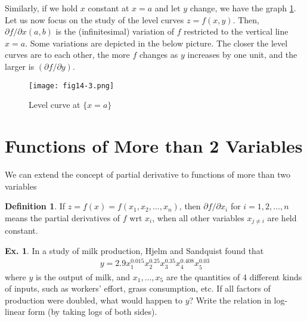 \documentclass[10pt,a4paper]{book}
\theoremstyle{definition}\newtheorem{definition}{Definition}
\theoremstyle{definition}\newtheorem{fact}{Fact}
\theoremstyle{definition}\newtheorem{ex}{Ex.}
\theoremstyle{definition}\newtheorem{project}{Project}
\theoremstyle{definition}\newtheorem{problem}{Problem}
\theoremstyle{definition}\newtheorem{example}{Example}
\numberwithin{theorem}{chapter}
\numberwithin{corollary}{chapter}
\numberwithin{assumption}{chapter}
\numberwithin{definition}{chapter}
\numberwithin{prop}{chapter}
\numberwithin{notation}{chapter}
\numberwithin{problem}{chapter}
\numberwithin{example}{chapter}
\numberwithin{fact}{chapter}
\numberwithin{ex}{chapter}
\newenvironment{fdefinition}
{\begin{mdframed}\begin{definition}}
		{\end{definition}\end{mdframed}}
\begin{document}
	Similarly, if we hold $x$ constant at $x=a$ and let $y$ change, we have the graph \ref{fig:14-3}. Let us now focus on the study of the level curves $z=f(x,y)$. Then, $\partial f / \partial x (a,b)$ is the (infinitesimal) variation of $f$ restricted to the vertical line ${x=a}$. Some variations are depicted in the below picture. The closer the level curves are to each other, the more $f$ changes as $y$ increases by one unit, and the larger is $(\partial f/\partial y)$. 
	
	\begin{figure}[h!]
		\centering
		\texttt{[image: fig14-3.png]}
		\caption{Level curve at $\{x=a\}$}
		\label{fig:14-3}
	\end{figure}
	
	\section{Functions of More than 2 Variables}
	
	We can extend the concept of partial derivative to functions of more than two variables
	\begin{fdefinition}
		If $z=f(x) = f(x_1, x_2, \dots, x_n)$, then $\partial f/\partial x_i$ for $i=1,2,\dots,n$ means the partial derivatives of $f$ wrt $x_i$, when all other variables $x_{j \neq i}$ are held constant.
	\end{fdefinition}
	
	\begin{ex}
		In a study of milk production, Hjelm and Sandquist found that
		\begin{align*}
			y = 2.9 x_1^{0.015} x_2^{0.25} x_3^{0.35} x_4^{0.408} x_5^{0.03} 
		\end{align*}
		where $y$ is the output of milk, and $x_1, \dots, x_5$ are the quantities of 4 different kinds of inputs, such as workers' effort, grass consumption, etc. If all factors of production were doubled, what would happen to $y$? Write the relation in log-linear form (by taking logs of both sides).
	\end{ex}
	
\end{document}
